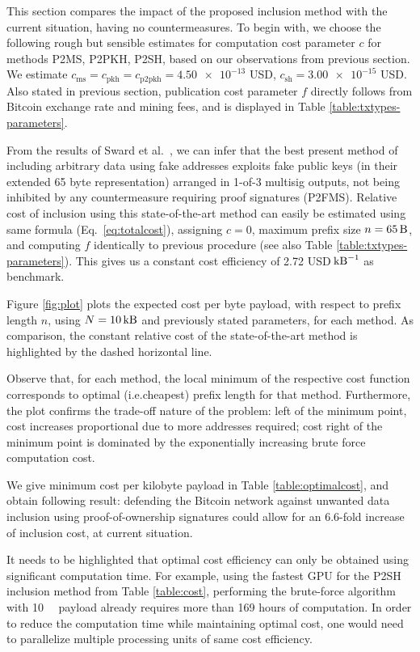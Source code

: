 \documentclass[a4paper,11pt,titlepage]{scrbook}
\begin{document}
This section compares the impact of the proposed inclusion method with the current situation, having no countermeasures.
To begin with, we choose the following rough but sensible estimates for computation cost parameter $c$ for methods P2MS, P2PKH, P2SH, based on our observations from previous section.
We estimate $c_\text{ms}=c_\text{pkh}=c_\text{p2pkh}=\num{4.50e-13}$ USD, $c_\text{sh} = \num{3.00e-15}$ USD.
Also stated in previous section, publication cost parameter $f$ directly follows from Bitcoin exchange rate and mining fees, and is displayed in Table \ref{table:txtypes-parameters}.

From the results of Sward et al.~\cite[cf.~Table 3]{sward_data_2018}, we can infer that the best present method of including arbitrary data using fake addresses exploits fake public keys (in their extended 65 byte representation) arranged in 1-of-3 multisig outputs, not being inhibited by any countermeasure requiring proof signatures (P2FMS).
Relative cost of inclusion using this state-of-the-art method can easily be estimated using same formula (Eq.~\ref{eq:totalcost}), assigning $c=0$, maximum prefix size $n=\SI{65}{\byte}$, and computing $f$ identically to previous procedure (see also Table \ref{table:txtypes-parameters}).
This gives us a constant cost efficiency of \num{2.72} USD$\,\si{\per\kilo\byte}$ as benchmark.

Figure \ref{fig:plot} plots the expected cost per byte payload, with respect to prefix length $n$, using $N=\SI{10}{\kilo\byte}$ and previously stated parameters, for each method.
As comparison, the constant relative cost of the state-of-the-art method is highlighted by the dashed horizontal line.

Observe that, for each method, the local minimum of the respective cost function corresponds to optimal (i.e.\@ cheapest) prefix length for that method.
Furthermore, the plot confirms the trade-off nature of the problem: left of the minimum point, cost increases proportional due to more addresses required; cost right of the minimum point is dominated by the exponentially increasing brute force computation cost.

We give minimum cost per kilobyte payload in Table \ref{table:optimalcost}, and obtain following result:
defending the Bitcoin network against unwanted data inclusion using proof-of-ownership signatures could allow for an \num{6.6}-fold increase of inclusion cost, at current situation.

It needs to be highlighted that optimal cost efficiency can only be obtained using significant computation time.
For example, using the fastest GPU for the P2SH inclusion method from Table \ref{table:cost}, performing the brute-force algorithm with \SI{10}{\kilo\byte} payload already requires more than 169 hours of computation.
In order to reduce the computation time while maintaining optimal cost, one would need to parallelize multiple processing units of same cost efficiency.
\end{document}
